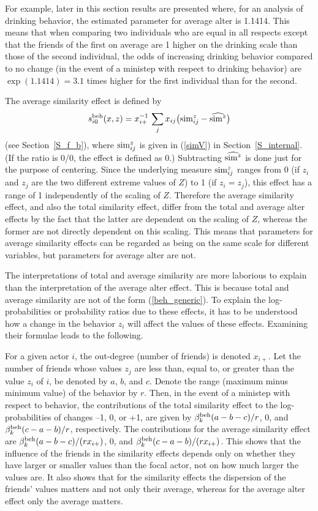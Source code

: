 \documentclass[a4paper,fleqn,11pt]{article}
\newcommand{\+}{\, + \,}
\newcommand{\vit}{\theenumi}
\begin{document}
For example, later in this section results are presented where,
for an analysis of drinking behavior, the
estimated parameter for average alter is 1.1414.
This means that when comparing two individuals who are equal in all respects
except that the friends of the first on average are  1 higher
on the drinking scale than those of the second individual,
the odds of increasing drinking behavior compared to no change
(in the event of a ministep with respect to drinking behavior)
are $\exp(1.1414) = 3.1$ times higher for the first individual
than for the second.
\medskip

The average similarity effect is defined by
\[ s^{\rm beh}_{i\vit}(x, z) = x_{i+}^{-1} \,
           \sum_j x_{ij} \big({\rm sim}^z_{ij} - \widehat{{\rm sim}^z}\big)
\]
(see Section~\ref{S_f_b}), where ${\rm sim}^z_{ij}$ is given in (\ref{simV})
in Section~\ref{S_internal}.
(If the ratio is 0/0, the effect is defined as 0.)
Subtracting $\widehat{{\rm sim}^z}$ is done just for the purpose
of centering.
Since the underlying measure ${\rm sim}^z_{ij}$ ranges from 0
(if $z_i$ and $z_j$ are the two different extreme values of $Z$)
to 1 (if $z_i = z_j$), this effect has a range of 1 independently
of the scaling of $Z$.
Therefore the average similarity effect, and also the total
similarity effect, differ from the total and average
alter effects by the fact that the latter are dependent on the scaling
of $Z$, whereas the former are not directly dependent on this scaling.
This means that parameters for average similarity effects can be regarded
as being on the same scale for different variables, but parameters
for average alter are not.
\medskip

The interpretations of total and average similarity are more laborious
to explain than the interpretation of the average alter effect.
This is because total and average similarity are not of the form
(\ref{beh_generic}). To explain the log-probabilities or probability ratios due to these
effects, it has to be understood how a change in the behavior $z_i$
will affect the values of these effects.
Examining their formulae leads to the following.

For a given actor $i$, the out-degree (number of friends) is denoted $x_{i+}$.
Let the number of friends whose values $z_j$ are less than, equal to,
or greater than the value $z_i $ of $i$, be denoted by $a$, $b$, and $c$.
Denote the range (maximum minus minimum value) of the behavior by $r$.
Then, in the event of a ministep with respect to behavior,
the contributions of the total similarity effect to the log-probabilities
of changes --1, 0, or +1, are given by $\beta^{\rm beh}_k(a-b-c)/r$,
0, and $\beta^{\rm beh}_k(c-a-b)/r$, respectively.
The contributions for the average similarity effect are
$\beta^{\rm beh}_k(a-b-c)/(rx_{i+})$,
0, and $\beta^{\rm beh}_k(c-a-b)/(rx_{i+})$.
This shows that the influence of the friends in the similarity effects
depends only on whether they have larger or smaller values than the focal actor,
not on how much larger the values are.
It also shows that for the similarity effects the dispersion of the
friends' values matters and not only their average,
whereas for the average alter effect only the average matters.
\end{document}
